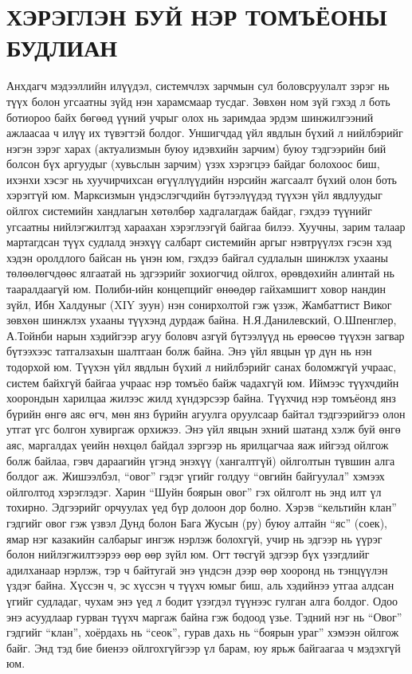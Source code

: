 \section{ХЭРЭГЛЭН БУЙ НЭР ТОМЪЁОНЫ БУДЛИАН}
Анхдагч мэдээллийн илүүдэл, системчлэх зарчмын сул боловсруулалт зэрэг нь түүх болон угсаатны зүйд нэн харамсмаар тусдаг. Зөвхөн ном зүй гэхэд л боть ботиороо байх бөгөөд үүний учрыг олох нь заримдаа эрдэм шинжилгээний ажлаасаа ч илүү их түвэгтэй болдог. Уншигчдад үйл явдлын бүхий л нийлбэрийг нэгэн зэрэг харах (актуализмын буюу идэвхийн зарчим) буюу тэдгээрийн бий болсон бүх аргуудыг (хувьслын зарчим) үзэх хэрэгцээ байдаг болохоос биш, ихэнхи хэсэг нь хуучирчихсан өгүүллүүдийн нэрсийн жагсаалт бүхий олон боть хэрэггүй юм. Марксизмын үндэслэгчдийн бүтээлүүдэд түүхэн үйл явдлуудыг ойлгох системийн хандлагын хөтөлбөр хадгалагдаж байдаг, гэхдээ түүнийг угсаатны нийлэгжилтэд хараахан хэрэглээгүй байгаа билээ.
Хуучны, зарим талаар мартагдсан түүх судлалд энэхүү салбарт системийн аргыг нэвтрүүлэх гэсэн хэд хэдэн оролдлого байсан нь үнэн юм, гэхдээ байгал судлалын шинжлэх ухааны төлөөлөгчдөөс ялгаатай нь эдгээрийг зохиогчид ойлгох, өрөвдөхийн алинтай нь тааралдаагүй юм. Полиби-ийн концепцийг өнөөдөр гайхамшигт ховор нандин зүйл, Ибн Халдуныг (XIY зуун) нэн сонирхолтой гэж үзэж, Жамбаттист Виког зөвхөн шинжлэх ухааны түүхэнд дурдаж байна. Н.Я.Данилевский, О.Шпенглер, А.Тойнби нарын хэдийгээр агуу боловч азгүй бүтээлүүд нь ерөөсөө түүхэн загвар бүтээхээс татгалзахын шалтгаан болж байна. Энэ үйл явцын үр дүн нь нэн тодорхой юм. Түүхэн үйл явдлын бүхий л нийлбэрийг санах боломжгүй учраас, систем байхгүй байгаа учраас нэр томъёо байж чадахгүй юм. Иймээс түүхчдийн хоорондын харилцаа жилээс жилд хүндэрсээр байна.
Түүхчид нэр томъёонд янз бүрийн өнгө аяс өгч, мөн янз бүрийн агуулга оруулсаар байтал тэдгээрийгээ олон утгат үгс болгон хувиргаж орхижээ. Энэ үйл явцын эхний шатанд хэлж буй өнгө аяс, маргалдах үеийн нөхцөл байдал зэргээр нь ярилцагчаа яаж ийгээд ойлгож болж байлаа, гэвч дараагийн үгэнд энэхүү (хангалтгүй) ойлголтын түвшин алга болдог аж. Жишээлбэл, “овог” гэдэг үгийг голдуу “овгийн байгуулал” хэмээх ойлголтод хэрэглэдэг. Харин “Шуйн боярын овог” гэх ойлголт нь энд илт үл тохирно. Эдгээрийг орчуулах үед бүр долоон дор болно. Хэрэв “кельтийн клан” гэдгийг овог гэж үзвэл Дунд болон Бага Жусын (ру) буюу алтайн “яс” (соек), ямар нэг казакийн салбарыг ингэж нэрлэж болохгүй, учир нь эдгээр нь үүрэг болон нийлэгжилтээрээ өөр өөр зүйл юм.
Огт төсгүй эдгээр бүх үзэгдлийг адилханаар нэрлэж, тэр ч байтугай энэ үндсэн дээр өөр хооронд нь тэнцүүлэн үздэг байна. Хүссэн ч, эс хүссэн ч түүхч юмыг биш, аль хэдийнээ утгаа алдсан үгийг судладаг, чухам энэ үед л бодит үзэгдэл түүнээс гулган алга болдог. Одоо энэ асуудлаар гурван түүхч маргаж байна гэж бодоод үзье. Тэдний нэг нь “Овог” гэдгийг “клан”, хоёрдахь нь “сеок”, гурав дахь нь “боярын ураг” хэмээн ойлгож байг. Энд тэд бие биенээ ойлгохгүйгээр үл барам, юу ярьж байгаагаа ч мэдэхгүй юм.
